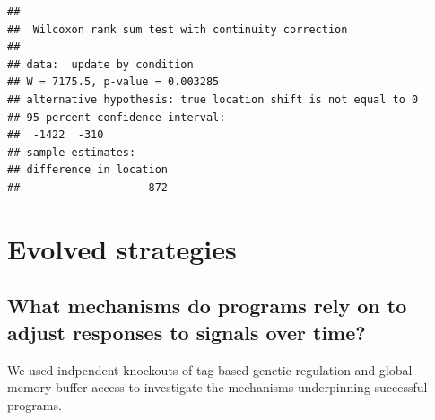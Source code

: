 \documentclass[
]{book}
\begin{document}
\begin{verbatim}
## 
##  Wilcoxon rank sum test with continuity correction
## 
## data:  update by condition
## W = 7175.5, p-value = 0.003285
## alternative hypothesis: true location shift is not equal to 0
## 95 percent confidence interval:
##  -1422  -310
## sample estimates:
## difference in location 
##                   -872
\end{verbatim}

\hypertarget{evolved-strategies-2}{%
\section{Evolved strategies}\label{evolved-strategies-2}}

\hypertarget{what-mechanisms-do-programs-rely-on-to-adjust-responses-to-signals-over-time-2}{%
\subsection{What mechanisms do programs rely on to adjust responses to signals over time?}\label{what-mechanisms-do-programs-rely-on-to-adjust-responses-to-signals-over-time-2}}

We used indpendent knockouts of tag-based genetic regulation and global memory buffer access to investigate the mechanisms underpinning successful programs.
\end{document}
